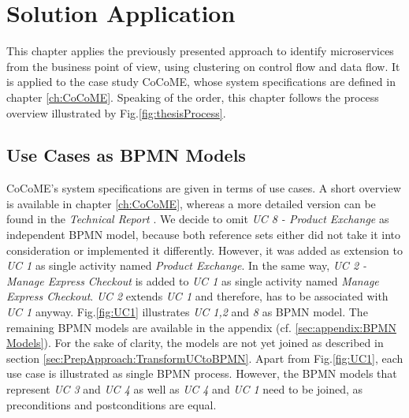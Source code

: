 \chapter{Solution Application}
\label{ch:SolutionApplication}
This chapter applies the previously presented approach to identify microservices from the business point of view, using clustering on control flow and data flow. It is applied to the case study CoCoME, whose system specifications are defined in chapter \ref{ch:CoCoME}. Speaking of the order, this chapter follows the process overview illustrated by Fig.\ref{fig:thesisProcess}.

\section{Use Cases as BPMN Models}
CoCoME's system specifications are given in terms of use cases. A short overview is available in chapter \ref{ch:CoCoME}, whereas a more detailed version can be found in the \textit{Technical Report} \cite{CoCoMETechnical}. We decide to omit  \textit{UC 8 - Product Exchange} as independent BPMN model, because both reference sets either did not take it into consideration or implemented it differently. However, it was added as extension to \textit{UC 1} as single activity named \textit{Product Exchange}. In the same way, \textit{UC 2 - Manage Express Checkout} is added to \textit{UC 1} as single activity named \textit{Manage Express Checkout}. \textit{UC 2} extends \textit{UC 1} and therefore, has to be associated with \textit{UC 1} anyway.  Fig.\ref{fig:UC1} illustrates \textit{UC 1,2} and \textit{8} as BPMN model. The remaining BPMN models are available in the appendix (cf. \ref{sec:appendix:BPMN Models}). For the sake of clarity, the models are not yet joined as described in section \ref{sec:PrepApproach:TransformUCtoBPMN}. Apart from Fig.\ref{fig:UC1}, each use case is illustrated as single BPMN process. However, the BPMN models that represent \textit{UC 3} and \textit{UC 4} as well as \textit{UC 4} and \textit{UC 1} need to be joined, as preconditions and postconditions are equal. 



